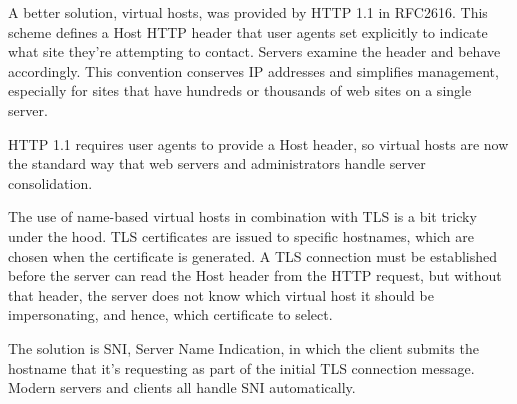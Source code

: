 A better solution, virtual hosts, was provided by HTTP 1.1 in RFC2616.
This scheme defines a Host HTTP header that user agents set explicitly
to indicate what site they're attempting to contact. Servers examine the
header and behave accordingly. This convention conserves IP addresses
and simplifies management, especially for sites that have hundreds or
thousands of web sites on a single server.

HTTP 1.1 {requires} user agents to provide a Host header, so virtual
hosts are now the standard way that web servers and administrators
handle server consolidation.

The use of name-based virtual hosts in combination with TLS is a bit
tricky under the hood. TLS certificates are issued to specific
hostnames, which are chosen when the certificate is generated. A TLS
connection must be established before the server can read the Host
header from the HTTP request, but without that header, the server does
not know which virtual host it should be impersonating, and hence, which
certificate to select.

The solution is
\protect\hypertarget{part0027_split_007.htmlux5cux23_idIndexMarker2779}{}{}\protect\hypertarget{part0027_split_007.htmlux5cux23_idIndexMarker2780}{}{}SNI,
Server Name Indication, in which the client submits the hostname that
it's requesting as part of the initial TLS connection message. Modern
servers and clients all handle SNI automatically.
